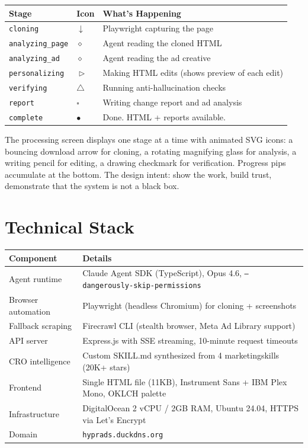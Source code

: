 \documentclass{article}
\begin{document}
\begin{center}
\small
\begin{tabular}{llp{6cm}}
\toprule
\textbf{Stage} & \textbf{Icon} & \textbf{What's Happening} \\
\midrule
\texttt{cloning} & $\downarrow$ & Playwright capturing the page \\
\texttt{analyzing\_page} & $\diamond$ & Agent reading the cloned HTML \\
\texttt{analyzing\_ad} & $\diamond$ & Agent reading the ad creative \\
\texttt{personalizing} & $\vartriangleright$ & Making HTML edits (shows preview of each edit) \\
\texttt{verifying} & $\triangle$ & Running anti-hallucination checks \\
\texttt{report} & $\square$ & Writing change report and ad analysis \\
\texttt{complete} & $\bullet$ & Done. HTML + reports available. \\
\bottomrule
\end{tabular}
\end{center}

The processing screen displays one stage at a time with animated SVG icons: a bouncing download arrow for cloning, a rotating magnifying glass for analysis, a writing pencil for editing, a drawing checkmark for verification. Progress pips accumulate at the bottom. The design intent: show the work, build trust, demonstrate that the system is not a black box.

\section{Technical Stack}

\begin{center}
\begin{tabular}{lp{9cm}}
\toprule
\textbf{Component} & \textbf{Details} \\
\midrule
Agent runtime & Claude Agent SDK (TypeScript), Opus 4.6, \texttt{--dangerously-skip-permissions} \\
Browser automation & Playwright (headless Chromium) for cloning + screenshots \\
Fallback scraping & Firecrawl CLI (stealth browser, Meta Ad Library support) \\
API server & Express.js with SSE streaming, 10-minute request timeouts \\
CRO intelligence & Custom SKILL.md synthesized from 4 marketingskills (20K+ stars) \\
Frontend & Single HTML file (11KB), Instrument Sans + IBM Plex Mono, OKLCH palette \\
Infrastructure & DigitalOcean 2 vCPU / 2GB RAM, Ubuntu 24.04, HTTPS via Let's Encrypt \\
Domain & \texttt{hyprads.duckdns.org} \\
\bottomrule
\end{tabular}
\end{center}
\end{document}
